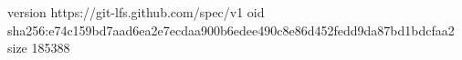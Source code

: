 version https://git-lfs.github.com/spec/v1
oid sha256:e74c159bd7aad6ea2e7ecdaa900b6edee490c8e86d452fedd9da87bd1bdcfaa2
size 185388
